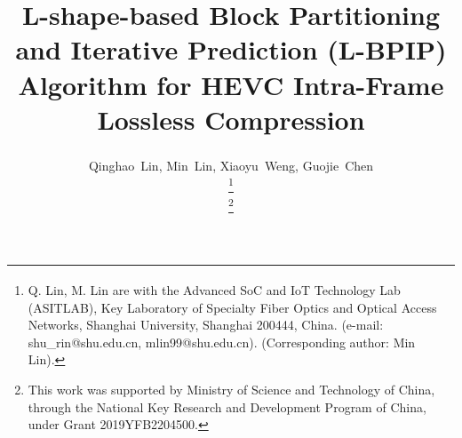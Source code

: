 \documentclass[journal]{IEEEtran}
\begin{document}
%
\title{L-shape-based Block Partitioning and Iterative Prediction (L-BPIP) Algorithm for HEVC Intra-Frame Lossless Compression}
%
%
%

\author{
    Qinghao~Lin, Min~Lin\textsuperscript{\Letter}, Xiaoyu~Weng, Guojie~Chen

    \thanks{Q. Lin, M. Lin\textsuperscript{\Letter} are with the Advanced SoC and IoT Technology Lab (ASITLAB), Key Laboratory of Specialty Fiber Optics and Optical Access Networks, Shanghai University, Shanghai 200444, China. (e-mail: shu\_rin@shu.edu.cn, mlin99@shu.edu.cn). (Corresponding author: Min Lin).}

    \thanks{This work was supported by Ministry of Science and Technology of China, through the National Key Research and Development Program of China, under Grant 2019YFB2204500.}
}



% 
%
\end{document}
